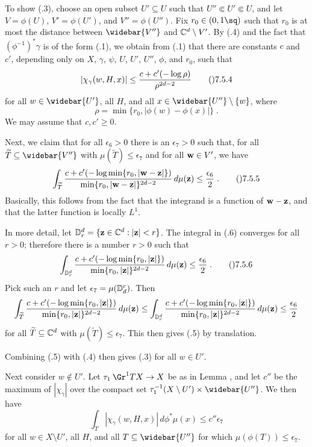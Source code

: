 To show (.3),
choose an open subset $U'\subseteq U$ such that $U''\Subset U'\Subset U$,
and let $V=\phi(U)$, $V'=\phi(U')$, and $V''=\phi(U'')$.
Fix $r_0\in(0,1\sq)$ such that $r_0$ is at most the distance between
$\widebar{V''}$ and $\Bbb C^d\setminus V'$.
By (.4) and the fact that $(\phi^{-1})^{*}\gamma$ is of the form (.1),
we obtain from (.1) that there are constants $c$ and $c'$, depending
only on $X$, $\gamma$, $\psi$, $U$, $U'$, $U''$, $\phi$, and $r_0$, such that
$$|\chi_\gamma(w,H,x)| \le \frac{c+c'(-\log\rho)}{\rho^{2d-2}}\tag\07.5.4$$
for all $w\in\widebar{U'}$, all $H$, and all $x\in\widebar{U''}\setminus\{w\}$,
where
$$\rho = \min\{r_0,|\phi(w)-\phi(x)|\}\;.$$
We may assume that $c,c'\ge0$.

Next, we claim that for all $\epsilon_6>0$ there is an $\epsilon_7>0$
such that, for all $\widetilde T\subseteq\widebar{V''}$
with $\mu(\widetilde T)\le\epsilon_7$ and for all $\bold w\in V'$, we have
$$\int_{\widetilde T} \frac{c+c'(-\log\min\{r_0,|\bold w-\bold z|\})}
    {\min\{r_0,|\bold w-\bold z|\}^{2d-2}}\,d\mu(\bold z)
  \le \frac{\epsilon_6}{2}\;.\tag\07.5.5$$
Basically, this follows from the fact that the integrand is a function
of $\bold w-\bold z$, and that the latter function is locally $L^1$.

In more detail, let $\Bbb D^d_r=\{\bold z\in\Bbb C^d:|\bold z|<r\}$.
The integral in (.6) converges for all $r>0$; therefore there is
a number $r>0$ such that
$$\int_{\Bbb D^d_r} \frac{c+c'(-\log\min\{r_0,|\bold z|\})}
    {\min\{r_0,|\bold z|\}^{2d-2}}\,d\mu(\bold z)
  \le \frac{\epsilon_6}{2}\;.\tag\07.5.6$$
Pick such an $r$ and let $\epsilon_7=\mu(\Bbb D_d^r)$.  Then
$$\int_{\widetilde T} \frac{c+c'(-\log\min\{r_0,|\bold z|\})}
    {\min\{r_0,|\bold z|\}^{2d-2}}\,d\mu(\bold z)
  \le \int_{\Bbb D^d_r} \frac{c+c'(-\log\min\{r_0,|\bold z|\})}
    {\min\{r_0,|\bold z|\}^{2d-2}}\,d\mu(\bold z) \le \frac{\epsilon_6}{2}$$
for all $\widetilde T\subseteq\Bbb C^d$ with $\mu(\widetilde T)\le\epsilon_7$.
This then gives (.5) by translation.

Combining (.5) with (.4) then gives (.3) for all $w\in U'$.

Next consider $w\notin U'$.  Let $\tau_1\:\Gr^1 TX\to X$ be as in
Lemma , and let $c''$ be the maximum of $|\chi_\gamma|$ over
the compact set $\tau_1^{-1}(X\setminus U')\times\widebar{U''}$.  We then have
$$\int_T |\chi_\gamma(w,H,x)|\,d\phi^{*}\mu(x) \le c''\epsilon_7$$
for all $w\in X\setminus U'$, all $H$, and all $T\subseteq\widebar{U''}$
for which $\mu(\phi(T))\le\epsilon_7$.


